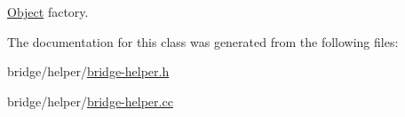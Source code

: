 \hyperlink{classns3_1_1Object}{Object} factory. 



The documentation for this class was generated from the following files\+:\begin{DoxyCompactItemize}
\item 
bridge/helper/\hyperlink{bridge-helper_8h}{bridge-\/helper.\+h}\item 
bridge/helper/\hyperlink{bridge-helper_8cc}{bridge-\/helper.\+cc}\end{DoxyCompactItemize}
